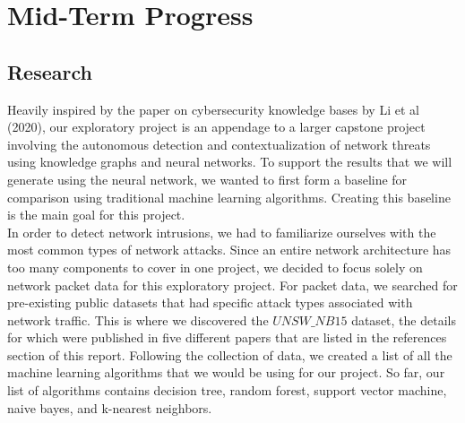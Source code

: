 \documentclass[
11pt, %
letterpaper, %
oneside, %
headinclude,footinclude, %
BCOR5mm, %
]{scrartcl}
\begin{document}


\section{Mid-Term Progress}
\subsection{Research}
 Heavily inspired by the paper on cybersecurity knowledge bases by Li et al (2020), our exploratory project is an appendage to a larger capstone project involving the autonomous detection and contextualization of network threats using knowledge graphs and neural networks. To support the results that we will generate using the neural network, we wanted to first form a baseline for comparison using traditional machine learning algorithms. Creating this baseline is the main goal for this project.\\
 In order to detect network intrusions, we had to familiarize ourselves with the most common types of network attacks. Since an entire network architecture has too many components to cover in one project, we decided to focus solely on network packet data for this exploratory project. For packet data, we searched for pre-existing public datasets that had specific attack types associated with network traffic. This is where we discovered the $UNSW\_NB15$ dataset, the details for which were published in five different papers that are listed in the references section of this report. Following the collection of data, we created a list of all the machine learning algorithms that we would be using for our project. So far, our list of algorithms contains decision tree, random forest, support vector machine, naive bayes, and k-nearest neighbors.
\end{document}
